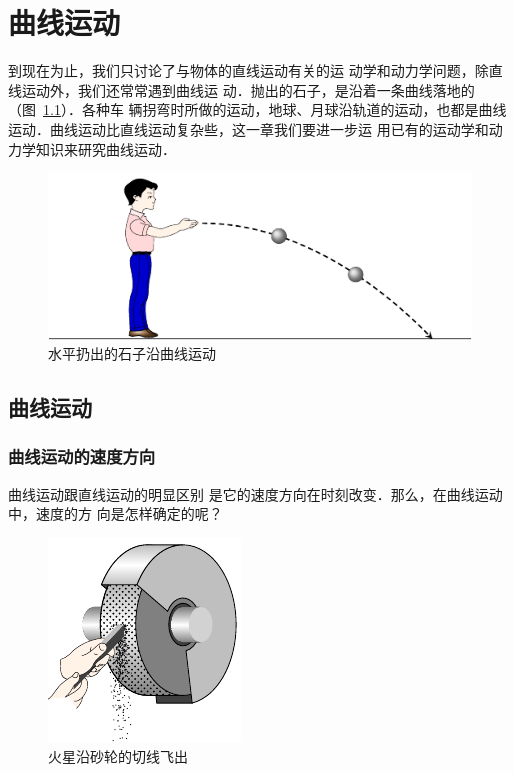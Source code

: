 \chapter{曲线运动}\label{chapter-curvilinear-motion}


    到现在为止，我们只讨论了与物体的直线运动有关的运
动学和动力学问题，除直线运动外，我们还常常遇到曲线运
动．抛出的石子，是沿着一条曲线落地的（图~\ref{fig_A_4-1}）．各种车
辆拐弯时所做的运动，地球、月球沿轨道的运动，也都是曲线
运动．曲线运动比直线运动复杂些，这一章我们要进一步运
用已有的运动学和动力学知识来研究曲线运动．

\begin{figure}[htbp]
    \centering
    \includegraphics{fig/A/4-1.pdf}
    \caption{水平扔出的石子沿曲线运动}\label{fig_A_4-1}
\end{figure}

\section{曲线运动}
    \subsection{曲线运动的速度方向}
    
    曲线运动跟直线运动的明显区别
是它的速度方向在时刻改变．那么，在曲线运动中，速度的方
向是怎样确定的呢？

\begin{figure}[htbp]
    \centering
    \includegraphics{fig/A/4-2.pdf}
    \caption{火星沿砂轮的切线飞出}\label{fig_A_4-2}
\end{figure}


